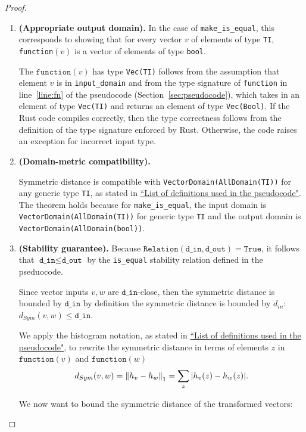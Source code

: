 \documentclass[11pt,a4paper]{article}
\newcommand{\din}{\texttt{d\_in}}
\newcommand{\dout}{\texttt{d\_out}}
\newcommand{\Relation}{\texttt{Relation}}
\newcommand{\function}{\texttt{function}}
\begin{document}
\begin{proof}
\begin{enumerate}
\item \textbf{(Appropriate output domain).} In the case of \texttt{make\_is\_equal}, this corresponds to showing that for every vector $v$ of elements of type \texttt{TI}, \texttt{function}$(v)$ is a vector of elements of type \texttt{bool}.


The $\function(v)$ has type \texttt{Vec(TI)} follows from the assumption that element $v$ is in \texttt{input\_domain} and from the type signature of \texttt{function} in line~\ref{line:fn} of the pseudocode (Section~\ref{sec:pseudocode}), which takes in an element of type \texttt{Vec(TI)} and returns an element of type \texttt{Vec(Bool)}. If the Rust code compiles correctly, then the type correctness follows from the definition of the type signature enforced by Rust. Otherwise, the code raises an exception for incorrect input type. 

\item \textbf{(Domain-metric compatibility).} 

Symmetric distance is compatible with \texttt{VectorDomain(AllDomain(TI))} for any generic type \texttt{TI}, as stated in \href{https://www.overleaf.com/project/60d215bf90b337ac02200a99}{``List of definitions used in the pseudocode"}. The theorem holds because for \texttt{make\_is\_equal}, the input domain is \texttt{VectorDomain(AllDomain(TI))} for generic type \texttt{TI} and the output domain is \texttt{VectorDomain(AllDomain(bool))}. 

\item \textbf{(Stability guarantee).} 
Because $\Relation(\din, \dout) = \texttt{True}$, it follows that $\din \leq \dout$ by the \texttt{is\_equal} stability relation defined in the pseduocode.

Since vector inputs $v, w$ are $\din$-close, then the symmetric distance is bounded by $\din$ by definition the symmetric distance is bounded by $d_{in}$: $d_{Sym}(v, w) \leq \din$.

We apply the histogram notation, as stated in \href{https://www.overleaf.com/project/60d215bf90b337ac02200a99}{``List of definitions used in the pseudocode"}, to rewrite the symmetric distance in terms of elements $z$ in $\texttt{function}(v)$ and $\texttt{function}(w)$
$$d_{Sym}(v, w) = \norm{h_v - h_w}_1 = \sum_{z} \abs{h_v(z) - h_w(z)}.$$ 

We now want to bound the symmetric distance of the transformed vectors:


\end{enumerate}
\end{proof}
\end{document}
